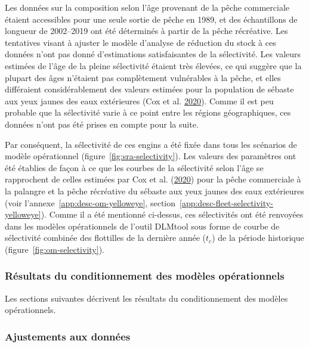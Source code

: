 \documentclass[french,11pt]{book}
\begin{document}
Les données sur la composition selon l'âge provenant de la pêche commerciale étaient accessibles pour une seule sortie de pêche en 1989, et des échantillons de longueur de 2002--2019 ont été déterminés à partir de la pêche récréative. Les tentatives visant à ajuster le modèle d'analyse de réduction du stock à ces données n'ont pas donné d'estimations satisfaisantes de la sélectivité. Les valeurs estimées de l'âge de la pleine sélectivité étaient très élevées, ce qui suggère que la plupart des âges n'étaient pas complètement vulnérables à la pêche, et elles différaient considérablement des valeurs estimées pour la population de sébaste aux yeux jaunes des eaux extérieures (Cox et al. \protect\hyperlink{ref-cox2020}{2020}). Comme il est peu probable que la sélectivité varie à ce point entre les régions géographiques, ces données n'ont pas été prises en compte pour la suite.

Par conséquent, la sélectivité de ces engins a été fixée dans tous les scénarios de modèle opérationnel (figure~\ref{fig:sra-selectivity}). Les valeurs des paramètres ont été établies de façon à ce que les courbes de la sélectivité selon l'âge se rapprochent de celles estimées par Cox et al. (\protect\hyperlink{ref-cox2020}{2020}) pour la pêche commerciale à la palangre et la pêche récréative du sébaste aux yeux jaunes des eaux extérieures (voir l'annexe~\ref{app:desc-om-yelloweye}, section~\ref{app:desc-fleet-selectivity-yelloweye}). Comme il a été mentionné ci-dessus, ces sélectivités ont été renvoyées dans les modèles opérationnels de l'outil DLMtool sous forme de courbe de sélectivité combinée des flottilles de la dernière année (\(t_c\)) de la période historique (figure~\ref{fig:om-selectivity}).

\hypertarget{sec:approach3-conditioning-results}{%
\subsubsection{Résultats du conditionnement des modèles opérationnels}\label{sec:approach3-conditioning-results}}

Les sections suivantes décrivent les résultats du conditionnement des modèles opérationnels.

\hypertarget{sec:approach3-conditioning-indices}{%
\subsubsection{Ajustements aux données}\label{sec:approach3-conditioning-indices}}
\end{document}
